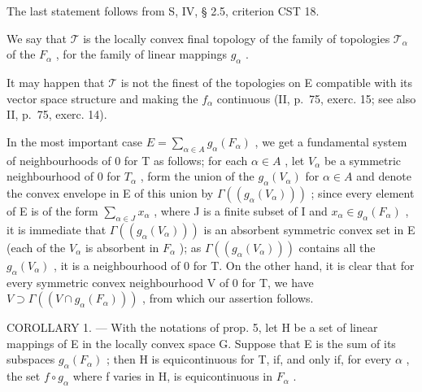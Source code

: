 The last statement follows from S, IV, § 2.5, criterion CST 18.

We say that \(\mathcal{T}\) is the locally convex final topology of the family of topologies \(\mathcal{T}_{\alpha}\) of the \(F_{\alpha}\) , for the family of linear mappings \(g_{\alpha}\) .

It may happen that \(\mathcal{T}\) is not the finest of the topologies on E compatible with its vector space structure and making the \(f_{\alpha}\) continuous (II, p.~75, exerc. 15; see also II, p.~75, exerc. 14).

In the most important case \(E = \sum_{\alpha \in A} g_{\alpha}(F_{\alpha})\) , we get a fundamental system of neighbourhoods of 0 for T as follows; for each \(\alpha \in A\) , let \(V_{\alpha}\) be a symmetric neighbourhood of 0 for \(T_{\alpha}\) , form the union of the \(g_{\alpha}(V_{\alpha})\) for \(\alpha \in A\) and denote the convex envelope in E of this union by \(\Gamma((g_{\alpha}(V_{\alpha})))\) ; since every element of E is of the form \(\sum_{\alpha \in J} x_{\alpha}\) , where J is a finite subset of I and \(x_{\alpha} \in g_{\alpha}(F_{\alpha})\) , it is immediate that \(\Gamma((g_{\alpha}(V_{\alpha})))\) is an absorbent symmetric convex set in E (each of the \(V_{\alpha}\) is absorbent in \(F_{\alpha}\) ); as \(\Gamma((g_{\alpha}(V_{\alpha})))\) contains all the \(g_{\alpha}(V_{\alpha})\) , it is a neighbourhood of 0 for T. On the other hand, it is clear that for every symmetric convex neighbourhood V of 0 for T, we have \(V \supset \Gamma((V \cap g_{\alpha}(F_{\alpha})))\) , from which our assertion follows.

COROLLARY 1. --- With the notations of prop. 5, let H be a set of linear mappings of E in the locally convex space G. Suppose that E is the sum of its subspaces \(g_{\alpha}(F_{\alpha})\) ; then H is equicontinuous for T, if, and only if, for every \(\alpha\) , the set \(f \circ g_{\alpha}\) where f varies in H, is equicontinuous in \(F_{\alpha}\) .

